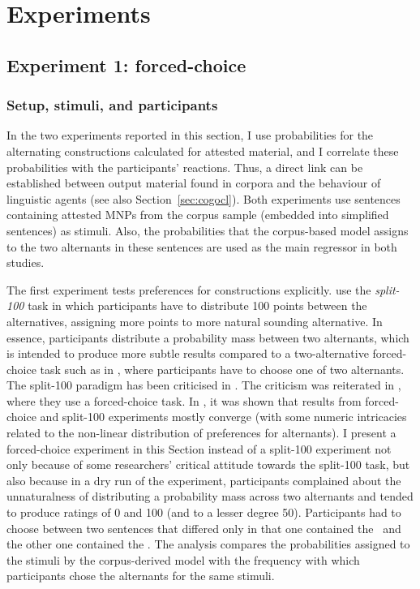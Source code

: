 \section{Experiments}
\label{sec:experimental}

\subsection{Experiment 1: forced-choice}
\label{sec:exp:fc}

\subsubsection{Setup, stimuli, and participants}

In the two experiments reported in this section, I use probabilities for the alternating constructions calculated for attested material, and I correlate these probabilities with the participants' reactions.
Thus, a direct link can be established between output material found in corpora and the behaviour of linguistic agents (see also Section~\ref{sec:cogocl}).
Both experiments use sentences containing attested MNPs from the corpus sample (embedded into simplified sentences) as stimuli.
Also, the probabilities that the corpus-based model assigns to the two alternants in these sentences are used as the main regressor in both studies.

The first experiment tests preferences for constructions explicitly.
\cite{FordBresnan2013} use the \textit{split-100} task in which participants have to distribute 100 points between the alternatives, assigning more points to more natural sounding alternative.
In essence, participants distribute a probability mass between two alternants, which is intended to produce more subtle results compared to a two-alternative forced-choice task such as in \cite{Rosenbach2013}, where participants have to choose one of two alternants.
The split-100 paradigm has been criticised in \cite{ArppeJaervikivi2007}.
The criticism was reiterated in \cite{DivjakEa2016}, where they use a forced-choice task.
In \cite{VerhoevenTemme2017}, it was shown that results from forced-choice and split-100 experiments mostly converge (with some numeric intricacies related to the non-linear distribution of preferences for alternants).
I present a forced-choice experiment in this Section instead of a split-100 experiment not only because of some researchers' critical attitude towards the split-100 task, but also because in a dry run of the experiment, participants complained about the unnaturalness of distributing a probability mass across two alternants and tended to produce ratings of 0 and 100 (and to a lesser degree 50).
Participants had to choose between two sentences that differed only in that one contained the \NACa\, and the other one contained the \PGCa.
The analysis compares the probabilities assigned to the stimuli by the corpus-derived model with the frequency with which participants chose the alternants for the same stimuli.

